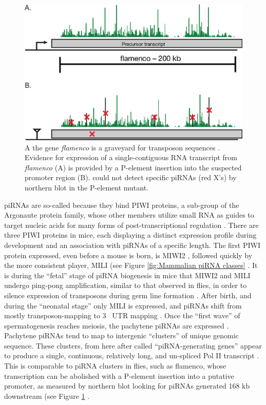 \begin{figure}[htbp]
	\centering 
	\includegraphics{Figures/Chapter1/FlamencoLocus.eps}
	\caption[Genetic evidence for long, continuous fly piRNA precursor transcripts]
	{
		A the \flies{} gene \textit{flamenco} is a graveyard for transposon sequences \citep{Pelisson1994}. Evidence for expression of a single-contiguous RNA transcript from \textit{flamenco} (A) is provided by a P-element insertion into the suspected promoter region (B). \citep{Brennecke2007} could not detect specific piRNAs (red X's) by northern blot in the P-element mutant.
	}
	\label{fig:flamenco}
\end{figure}


piRNAs are so-called because they bind PIWI proteins, a sub-group of the Argonaute protein family, whose other members utilize small RNA as guides to target nucleic acids for many forms of post-transcriptional regulation \citep{Siomi2011}. There are three PIWI proteins in mice, each displaying a distinct expression profile during development and an association with piRNAs of a specific length. The first PIWI protein expressed, even before a mouse is born, is MIWI2 \citep{Carmell2007}, followed quickly by the more consistent player, MILI (see Figure \ref{fig:Mammalian piRNA classes} \citep{Kuramochi-Miyagawa2004, Aravin2006}. It is during the ``fetal'' stage of piRNA biogenesis in mice that MIWI2 and MILI undergo ping-pong amplification, similar to that observed in flies, in order to silence expression of transposons during germ line formation \citep{Brennecke2007, Kuramochi-Miyagawa2008}. After birth, and during the ``neonatal stage'' only MILI is expressed, and piRNAs shift from mostly transposon-mapping to 3\textprime~ UTR mapping \citep{Robine2009}. Once the ``first wave'' of spermatogenesis \citep{Oakberg1956b, Laiho2013a} reaches meiosis, the pachytene piRNAs are expressed \citep{Girard2006, Lau2006, Li2013h}. Pachytene piRNAs tend to map to intergenic ``clusters'' of unique genomic sequence. These clusters, from here after called ``piRNA-generating genes'' appear to produce a single, continuous, relatively long, and un-spliced Pol II transcript \citep{Li2013h}. This is comparable to piRNA clusters in flies, such as flamenco, whose transcription can be abolished with a P-element insertion into a putative promoter, as measured by northern blot looking for piRNAs generated 168 kb downstream (see Figure \ref{fig:flamenco} \citep{Brennecke2007}. 
 
